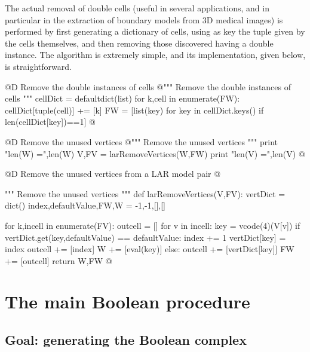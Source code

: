 \documentclass[11pt,oneside]{article}	%
\begin{document}
The actual removal of double cells (useful in several applications, and in particular in the extraction of boundary models from 3D medical images) is performed by first generating a dictionary of cells, using as key the tuple given by the cells themselves, and then removing those discovered having a double instance.
The algorithm is extremely simple, and its implementation, given below, is straightforward.

@D Remove the double instances of cells
@{""" Remove the double instances of cells """
cellDict = defaultdict(list)
for k,cell in enumerate(FW):
    cellDict[tuple(cell)] += [k]
FW = [list(key) for key in cellDict.keys() if len(cellDict[key])==1]
@}

@D Remove the unused vertices
@{""" Remove the unused vertices """
print "len(W) =",len(W)
V,FV = larRemoveVertices(W,FW)
print "len(V) =",len(V)
@}

@D Remove the unused vertices from a LAR model pair
@{""" Remove the unused vertices """
def larRemoveVertices(V,FV):
    vertDict = dict()
    index,defaultValue,FW,W = -1,-1,[],[]
        
    for k,incell in enumerate(FV):
        outcell = []
        for v in incell:
            key = vcode(4)(V[v])
            if vertDict.get(key,defaultValue) == defaultValue:
                index += 1
                vertDict[key] = index
                outcell += [index]
                W += [eval(key)]
            else: 
                outcell += [vertDict[key]]
        FW += [outcell]
    return W,FW
@}

\section{The main Boolean procedure}

\subsection{Goal: generating the Boolean complex}
\end{document}
